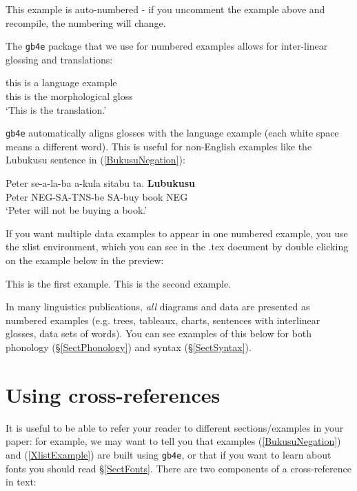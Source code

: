 \documentclass{article}
\begin{document}
\ea 
This example is auto-numbered - if you uncomment the example above and recompile, the numbering will change.
\z 

\noindent The \texttt{gb4e} package that we use for numbered examples allows for inter-linear glossing and translations: 

\ea 
\gll this is a language example \\
this is the morphological gloss \\
\glt `This is the translation.' 
\z 

\noindent  \texttt{gb4e} automatically aligns glosses with the language example (each white space means a different word). This is useful for non-English examples like the Lubukusu sentence in (\ref{BukusuNegation}): 

\ea \label{BukusuNegation}
\gll Peter se-a-la-ba a-kula sitabu ta. \hspace{2 in}  \textbf{Lubukusu} \\
Peter NEG-SA-TNS-be SA-buy book NEG \\
\glt `Peter will not be buying a book.'
\z

\noindent If you want multiple data examples to appear in one numbered example, you use the xlist environment, which you can see in the .tex document by double clicking on the example below in the preview: 

\ea \label{XlistExample}
\begin{xlist}

\ex This is the first example. 
\ex This is the second example. 

\end{xlist}

\z 

\noindent In many linguistics publications, \textit{all}  diagrams and data are presented as numbered examples (e.g. trees, tableaux, charts, sentences with interlinear glosses, data sets of words). You can see examples of this below for both phonology (\S \ref{SectPhonology}) and syntax (\S \ref{SectSyntax}). 

\section{Using cross-references} \label{SectCrossReferences}

It is useful to be able to refer your reader to different sections/examples in your paper: for example, we may want to tell you that examples (\ref{BukusuNegation}) and (\ref{XlistExample}) are built using \texttt{gb4e}, or that if you want to learn about fonts you should read \S \ref{SectFonts}. There are two components of a cross-reference in text: 
\end{document}

